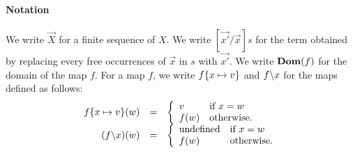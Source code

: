 



\paragraph{Notation} We write \(\vec{X}\) for a finite sequence of
\(X\).  We write \([\vec{x'}/\vec{x}]s\) for the term obtained by
replacing every free occurrences of \(\vec{x}\) in \(s\) with
\(\vec{x'}\).  We write \(\mathbf{Dom}(f)\) for the domain of the map \(f\).  For a
map \(f\), we write \(f \{x \mapsto v\}\) and \(f \backslash x\) for the
maps defined as follows:
\[
\begin{array}{rcl}
f \{x \mapsto v\} (w) &=&
\left\{
\begin{array}{ll}
v & \mbox{if \(x = w\)}\\
f(w) & \mbox{otherwise.}
\end{array}
\right.\\
(f \backslash x)(w) &=&
\left\{
\begin{array}{ll}
\mbox{undefined} & \mbox{if \(x = w\)}\\
f(w) & \mbox{otherwise.}
\end{array}
\right.
\end{array}
\]
